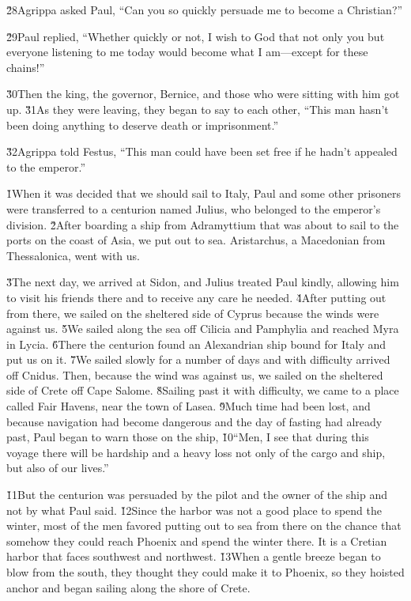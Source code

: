 \v{28}Agrippa asked Paul, ``Can you so quickly persuade me to become a Christian?''

\v{29}Paul replied, ``Whether quickly or not, I wish to God that not only you but everyone listening to me today would become what I am---except for these chains!''

\v{30}Then the king, the governor, Bernice, and those who were sitting with him got up. \v{31}As they were leaving, they began to say to each other, ``This man hasn't been doing anything to deserve death or imprisonment.''

\v{32}Agrippa told Festus, ``This man could have been set free if he hadn't appealed to the emperor.''

\v{1}When it was decided that we should sail to Italy, Paul and some other prisoners were transferred to a centurion named Julius, who belonged to the emperor's division. \v{2}After boarding a ship from Adramyttium that was about to sail to the ports on the coast of Asia, we put out to sea. Aristarchus, a Macedonian from Thessalonica, went with us.

\v{3}The next day, we arrived at Sidon, and Julius treated Paul kindly, allowing him to visit his friends there and to receive any care he needed. \v{4}After putting out from there, we sailed on the sheltered side of Cyprus because the winds were against us. \v{5}We sailed along the sea off Cilicia and Pamphylia and reached Myra in Lycia. \v{6}There the centurion found an Alexandrian ship bound for Italy and put us on it. \v{7}We sailed slowly for a number of days and with difficulty arrived off Cnidus. Then, because the wind was against us, we sailed on the sheltered side of Crete off Cape Salome. \v{8}Sailing past it with difficulty, we came to a place called Fair Havens, near the town of Lasea. \v{9}Much time had been lost, and because navigation had become dangerous and the day of fasting had already past, Paul began to warn those on the ship, \v{10}``Men, I see that during this voyage there will be hardship and a heavy loss not only of the cargo and ship, but also of our lives.''

\v{11}But the centurion was persuaded by the pilot and the owner of the ship and not by what Paul said. \v{12}Since the harbor was not a good place to spend the winter, most of the men favored putting out to sea from there on the chance that somehow they could reach Phoenix and spend the winter there. It is a Cretian harbor that faces southwest and northwest. \v{13}When a gentle breeze began to blow from the south, they thought they could make it to Phoenix, so they hoisted anchor and began sailing along the shore of Crete.

